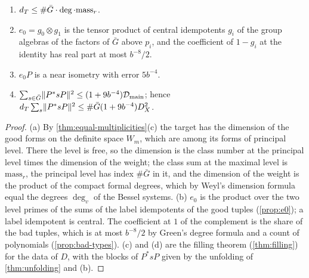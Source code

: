 \begin{theorem}\label{thm:spanning-inputs}
\begin{enumerate}[label=\textup{(\alph*)}]
\item $d_T\le\#\bar G\cdot\deg\cdot\mathrm{mass}_r$.
\item $e_0=g_0\otimes g_1$ is the tensor product of central idempotents $g_i$ of the group algebras of the factors of $\bar G$ above $p_i$, and the coefficient of $1-g_i$ at
the identity has real part at most $b^{-8}/2$.
\item $e_0P$ is a near isometry with error $5b^{-4}$.
\item $\sum_{s\in\bar G}\lVert P^*sP\rVert^2\le(1+9b^{-4})\mathcal D_{\rm main}$; hence $d_T\sum_s\lVert P^*sP\rVert^2\le\#\bar G(1+9b^{-4})D_X^2$.
\end{enumerate}
\end{theorem}

\begin{proof}
(a) By \cref{thm:equal-multiplicities}(c) the target has the dimension of the good forms on the definite space $W_m$, which are among its forms of principal
level. There the level is free, so the dimension is the class number at the principal level times the dimension of the weight; the class sum at the maximal
level is $\mathrm{mass}_r$, the principal level has index $\#\bar G$ in it, and the dimension of the weight is the product of the compact formal degrees, which by
Weyl's dimension formula equal the degrees $\deg_v$ of the Bessel systems. (b) $e_0$ is the product over the two level primes of the sums of the label
idempotents of the good tuples (\cref{prop:e0}); a label idempotent is central. The coefficient at $1$ of the complement is the share of the bad tuples, which
is at most $b^{-8}/2$ by Green's degree formula and a count of polynomials (\cref{prop:bad-types}). (c) and (d) are the filling theorem
(\cref{thm:filling}) for the data of $D$, with the blocks of $P^*sP$ given by the unfolding of \cref{thm:unfolding} and (b).
\end{proof}

